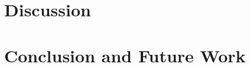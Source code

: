 \documentclass[english,12pt,a4paper]{book}
\begin{document}
\chapter{Discussion}

\chapter{Conclusion and Future Work}




\appendix
\appendixpage
\addappheadtotoc
\end{document}

